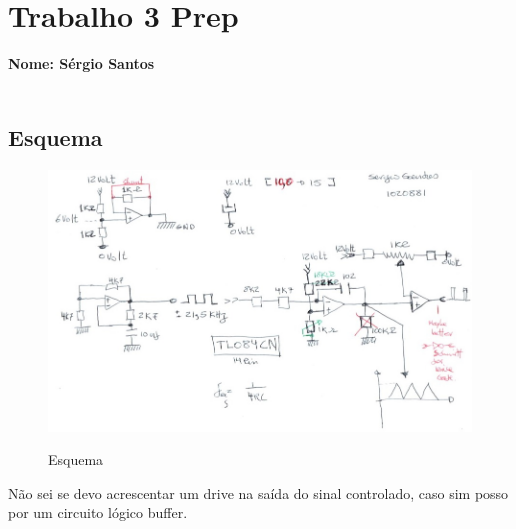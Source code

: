 \documentclass[titlepage, a4paper, 10pt, reqno, openany]{report}
\begin{document}
\renewcommand\thesection{\arabic{section}}
\renewcommand\thesubsection{\thesection.\arabic{subsection}}
\renewcommand\thesubsubsection{\thesection.\thesubsection.\arabic{subsubsection}}
\pagestyle{plain}%
\chapter*{Trabalho 3 Prep}
{\bf Nome: Sérgio Santos} \\
\hspace*{0.51cm}{\bf nº: 1020881}\\
\section{Esquema}
\begin{figure}[H]
	\centering
	\includegraphics[scale=0.7]{./image/esquema.jpg}\\
	\caption{Esquema}
\end{figure}
Não sei se devo acrescentar um drive na saída do sinal controlado, caso sim posso por um circuito lógico buffer. 
\newpage
\end{document}
